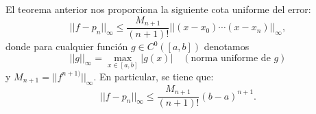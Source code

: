     \begin{remark}
      \label{rk:2}
      El teorema anterior nos proporciona la siguiente cota uniforme del
      error:
      \begin{equation}
        ||f-p_n||_{\infty} \le \frac{M_{n+1}}{(n+1)!}||(x-x_0)\cdots(x-x_n)||_\infty,
        \label{eq:cota-error-interpol-1}
      \end{equation}
      donde para cualquier función $g\in C^0([a,b])$ denotamos
      \begin{equation*}
        ||g||_\infty = \max_{x\in[a,b]} |g(x)|  \quad (\text{norma
          uniforme de $g$})
      \end{equation*}
      y $M_{n+1}=||f^{n+1)}||_\infty$.  En particular, se tiene que:
      \begin{equation*}
        ||f-p_n||_{\infty} \le \frac{M_{n+1}}{(n+1)!}(b-a)^{n+1}.
        \label{eq:cota-error-interpol-2}
      \end{equation*}
    \end{remark}

